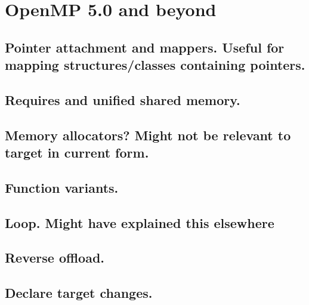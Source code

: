 
\chapter{OpenMP 5.0 and beyond}
\section{Pointer attachment and mappers. Useful for mapping structures/classes containing pointers.}
\section{Requires and unified shared memory.}
\section{Memory allocators? Might not be relevant to target in current form.}
\section{Function variants.}
\section{Loop. Might have explained this elsewhere}
\section{Reverse offload.}
\section{Declare target changes.}

